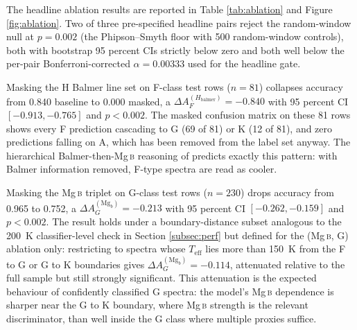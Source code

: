 \documentclass[11pt,a4paper]{article}
\newcommand{\Mgb}{Mg\,\textsc{b}\xspace}
\newcommand{\Teff}{$T_{\mathrm{eff}}$\xspace}
\newcommand{\dA}{\Delta A}
\begin{document}
The headline ablation results are reported in Table \ref{tab:ablation} and Figure \ref{fig:ablation}. Two of three pre-specified headline pairs reject the random-window null at $p = 0.002$ (the Phipson--Smyth floor with 500 random-window controls), both with bootstrap 95 percent CIs strictly below zero and both well below the per-pair Bonferroni-corrected $\alpha = 0.00333$ used for the headline gate.

Masking the H Balmer line set on F-class test rows ($n = 81$) collapses accuracy from 0.840 baseline to 0.000 masked, a $\dA_F^{(H_{\mathrm{balmer}})} = -0.840$ with 95 percent CI $[-0.913, -0.765]$ and $p < 0.002$. The masked confusion matrix on these 81 rows shows every F prediction cascading to G (69 of 81) or K (12 of 81), and zero predictions falling on A, which has been removed from the label set anyway. The hierarchical Balmer-then-\Mgb reasoning of \citet{GrayCorbally2009} predicts exactly this pattern: with Balmer information removed, F-type spectra are read as cooler.

Masking the \Mgb triplet on G-class test rows ($n = 230$) drops accuracy from 0.965 to 0.752, a $\dA_G^{(\mathrm{Mg}_b)} = -0.213$ with 95 percent CI $[-0.262, -0.159]$ and $p < 0.002$. The result holds under a boundary-distance subset analogous to the 200~K classifier-level check in Section \ref{subsec:perf} but defined for the (\Mgb, G) ablation only: restricting to spectra whose \Teff lies more than 150~K from the F to G or G to K boundaries gives $\dA_G^{(\mathrm{Mg}_b)} = -0.114$, attenuated relative to the full sample but still strongly significant. This attenuation is the expected behaviour of confidently classified G spectra: the model's \Mgb dependence is sharper near the G to K boundary, where \Mgb strength is the relevant discriminator, than well inside the G class where multiple proxies suffice.
\end{document}
